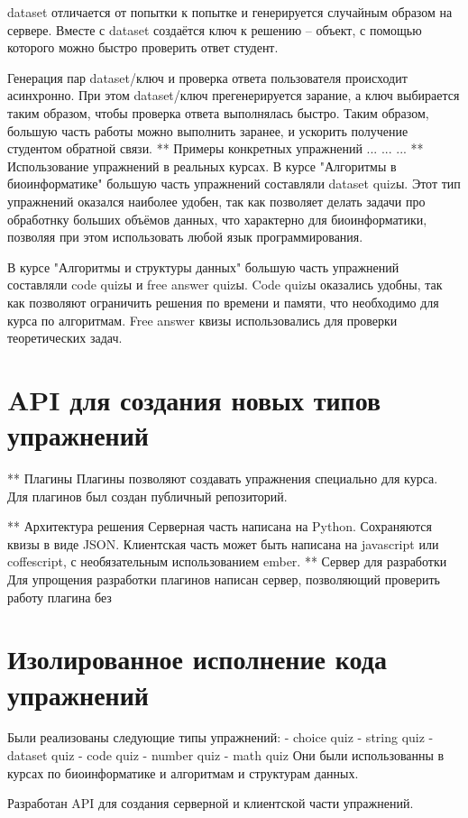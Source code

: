 \documentclass{matmex-diploma-custom}
\begin{document}
   dataset отличается от попытки к попытке и генерируется случайным образом на
   сервере. Вместе с dataset создаётся ключ к решению -- объект, с помощью
   которого можно быстро проверить ответ студент.

   Генерация пар dataset/ключ и проверка ответа пользователя происходит
   асинхронно. При этом dataset/ключ прегенерируется зарание, а ключ
   выбирается таким образом, чтобы проверка ответа выполнялась быстро.
   Таким  образом, большую часть работы можно выполнить заранее, и ускорить
   получение студентом обратной связи.
** Примеры конкретных упражнений
   ...
   ...
   ...
** Использование упражнений в реальных курсах.
   В курсе "Алгоритмы в биоинформатике" большую часть упражнений
   составляли dataset quizы. Этот тип упражнений оказался наиболее
   удобен, так как позволяет делать задачи про обработнку больших
   объёмов данных, что характерно для биоинформатики, позволяя при
   этом использовать любой язык программирования.

   В курсе "Алгоритмы и структуры данных" большую часть упражнений
   составляли code quizы и free answer quizы. Code quizы оказались
   удобны, так как позволяют ограничить решения по времени и памяти,
   что необходимо для курса по алгоритмам. Free answer квизы
   использовались для проверки теоретических задач.
\section{API для создания новых типов упражнений}
** Плагины
   Плагины позволяют создавать упражнения специально для курса.
   Для плагинов был создан публичный репозиторий.

** Архитектура решения
   Серверная часть написана на Python. Сохраняются квизы в виде JSON.
   Клиентская часть может быть написана на javascript или coffescript,
   с необязательным использованием ember.
** Сервер для разработки
   Для упрощения разработки плагинов написан сервер, позволяющий проверить
   работу плагина без

\section{Изолированное исполнение кода упражнений}

Были реализованы следующие типы упражнений:
- choice quiz
- string quiz
- dataset quiz
- code quiz
- number quiz
- math quiz
Они были использованны в курсах по биоинформатике
и алгоритмам и структурам данных.

Разработан API для создания серверной и клиентской части
упражнений.
\end{document}
